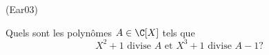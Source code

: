 \begin{tiny}(Ear03)\end{tiny} Quels sont les polynômes $A\in \C[X]$ tels que 
\[
 X^2+1 \text{ divise }A \text{ et } X^3+1 \text{ divise } A - 1 ?
\]
